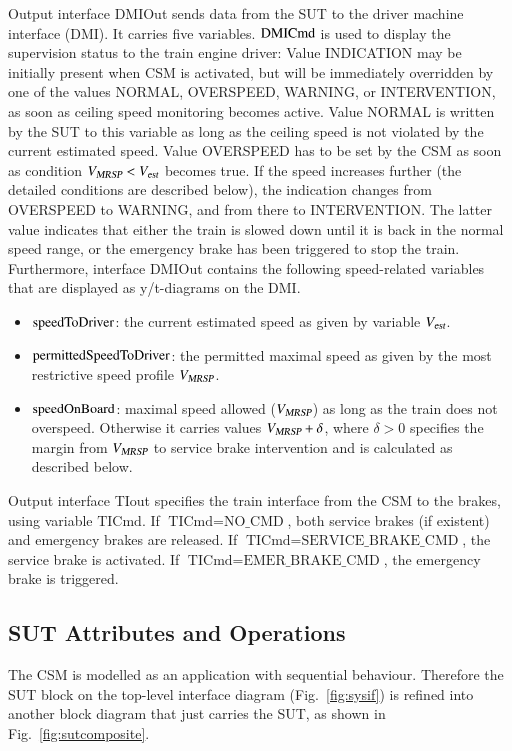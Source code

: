 Output interface {\sf DMIOut} sends data from the SUT to the driver
machine interface (DMI). It carries five variables. $\text{DMICmd}$ is used
to display the supervision status to the train engine driver: Value
INDICATION may be initially present when CSM is activated, but will be
immediately overridden by one of the values NORMAL, OVERSPEED,
WARNING, or INTERVENTION, as soon as ceiling speed monitoring becomes
active. Value NORMAL is written by the SUT to this variable as long as
the ceiling speed is not violated by the current estimated
speed. Value OVERSPEED has to be set by the CSM as soon as condition
${V_{\text{\sl MRSP}}} < {V_{\text{\sl est}}}$ becomes true. If the speed increases further (the
detailed conditions are described below), the indication changes from
OVERSPEED to WARNING, and from there to INTERVENTION. The latter value
indicates that either the train is slowed down until it is back in the
normal speed range, or the emergency brake has been triggered to stop
the train.  Furthermore, interface {\sf DMIOut} contains the following 
speed-related variables that are displayed as y/t-diagrams on the DMI.
\begin{itemize}
\item $\text{speedToDriver}$: the current estimated speed as given by variable ${V_{\text{\sl est}}}$.
\item $\text{permittedSpeedToDriver}$: the permitted maximal speed as given by the most 
restrictive speed profile ${V_{\text{\sl MRSP}}}$.
\item $\text{speedOnBoard}$: maximal speed allowed (${V_{\text{\sl MRSP}}}$) as long as the train does not
overspeed.  Otherwise it carries values ${V_{\text{\sl MRSP}}} + \delta$, where
$\delta > 0$ specifies the margin from ${V_{\text{\sl MRSP}}}$ to service brake
intervention and is calculated as described below.  
\end{itemize}




Output interface {\sf TIout} specifies the train interface from the CSM to the brakes, using 
variable $\text{TICmd}$. If $\text{TICmd} = \text{NO\_CMD}$, both service brakes (if existent) and
emergency brakes are released. If $\text{TICmd} = \text{SERVICE\_BRAKE\_CMD}$, the service brake 
is activated. If $\text{TICmd} = \text{EMER\_BRAKE\_CMD}$, the emergency brake is triggered.



\subsection{SUT Attributes and Operations}\label{sec:ops}
The CSM is modelled as an application with sequential behaviour. Therefore the 
SUT block on the top-level interface diagram (Fig.~\ref{fig:sysif})  is refined into another block 
diagram that just carries the SUT, as shown in Fig.~\ref{fig:sutcomposite}.




